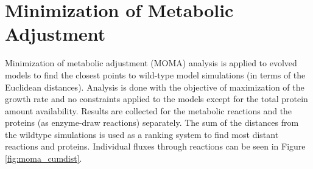 \begin{table}[H]
\vspace{0.5cm}
\caption[Producing and consuming reaction fluxes for the metabolite oxaloacetate (OXA).]{Producing and consuming reaction fluxes for the metabolite oxaloacetate (OXA).}
\setlength{\tabcolsep}{4pt}
\label{table:12OXA}
\end{table}

\section{Minimization of Metabolic Adjustment}

Minimization of metabolic adjustment (MOMA) analysis is applied to evolved models to find the closest points to wild-type model simulations (in terms of the Euclidean distances). Analysis is done with the objective of maximization of the growth rate and no constraints applied to the models except for the total protein amount availability. Results are collected for the metabolic reactions and the proteins (as enzyme-draw reactions) separately. The sum of the distances from the wildtype simulations is used as a ranking system to find most distant reactions and proteins. Individual fluxes through reactions can be seen in Figure \ref{fig:moma_cumdist}.


